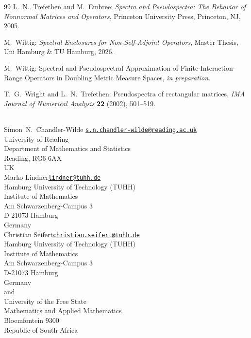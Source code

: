 \documentclass{article}
\numberwithin{equation}{section}   %
\numberwithin{figure}{section}  %
\begin{document}
\begin{thebibliography}{99}
{\sc L.~N.~Trefethen} and {\sc M.~Embree}:
{\it Spectra and Pseudospectra: The Behavior of Nonnormal Matrices and Operators},
Princeton University Press, Princeton, NJ, 2005.

{\sc M.~Wittig}:
{\it Spectral Enclosures for Non-Self-Adjoint Operators},
Master Thesis, Uni Hamburg \& TU Hamburg, 2026.

{\sc M.~Wittig}:
Spectral and Pseudospectral Approximation of Finite-Interaction-Range Operators in Doubling Metric Measure Spaces,
{\it in preparation}.

{\sc T.~G.~Wright} and {\sc L.~N.~Trefethen}:
Pseudospectra of rectangular matrices,
{\it IMA Journal of Numerical Analysis} {\bf 22} (2002), 501--519.

\end{thebibliography}

\vfill
{}\\[2mm]
Simon~N.~Chandler-Wilde \hfill \href{mailto:s.n.chandler-wilde@reading.ac.uk}{\tt s.n.chandler-wilde@reading.ac.uk}\\
University of Reading\\
Department of Mathematics and Statistics\\
Reading, RG6 6AX\\
UK\\[5mm]
%
Marko Lindner\hfill \href{mailto:lindner@tuhh.de}{\tt lindner@tuhh.de}\\
Hamburg University of Technology (TUHH)\\
Institute of Mathematics\\
Am Schwarzenberg-Campus 3\\
D-21073 Hamburg\\
Germany\\[5mm]
%
Christian Seifert\hfill \href{mailto:christian.seifert@tuhh.de}{\tt christian.seifert@tuhh.de}\\
Hamburg University of Technology (TUHH)\\
Institute of Mathematics\\
Am Schwarzenberg-Campus 3\\
D-21073 Hamburg\\
Germany\\
and\\
University of the Free State\\
Mathematics and Applied Mathematics \\
Bloemfontein 9300\\
Republic of South Africa
\end{document}
